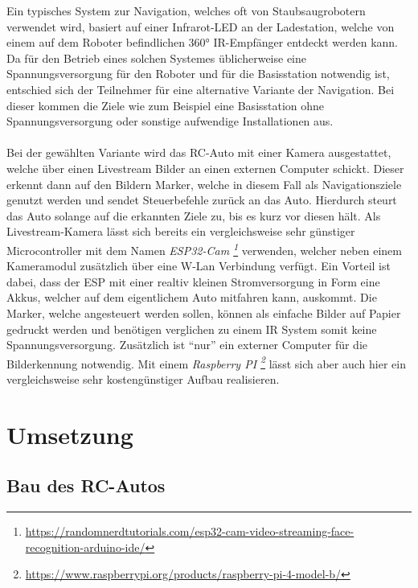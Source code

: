 \documentclass{article}
\begin{document}
Ein typisches System zur Navigation, welches oft von Staubsaugrobotern verwendet wird, basiert auf einer Infrarot-LED
an der Ladestation, welche von einem auf dem Roboter befindlichen 360° IR-Empfänger entdeckt werden kann.
Da für den Betrieb eines solchen Systemes üblicherweise eine Spannungsversorgung für den Roboter und für die Basisstation
notwendig ist, entschied sich der Teilnehmer für eine alternative Variante der Navigation. Bei dieser kommen die Ziele
wie zum Beispiel eine Basisstation ohne Spannungsversorgung oder sonstige aufwendige Installationen aus.
\\~\\
Bei der gewählten Variante wird das RC-Auto mit einer Kamera ausgestattet, welche über einen Livestream Bilder
an einen externen Computer schickt. Dieser erkennt dann auf den Bildern Marker, welche in diesem Fall als Navigationsziele
genutzt werden und sendet Steuerbefehle zurück an das Auto. Hierdurch steurt das Auto solange auf die erkannten Ziele zu,
bis es kurz vor diesen hält. Als Livestream-Kamera lässt sich bereits ein vergleichsweise sehr günstiger Microcontroller mit dem Namen
\textit{ESP32-Cam \footnote{\url{https://randomnerdtutorials.com/esp32-cam-video-streaming-face-recognition-arduino-ide/}}} verwenden,
welcher neben einem Kameramodul zusätzlich über eine W-Lan Verbindung verfügt. Ein Vorteil ist dabei, dass der ESP mit einer
realtiv kleinen Stromversorgung in Form eine Akkus, welcher auf dem eigentlichem Auto mitfahren kann, auskommt.
Die Marker, welche angesteuert werden sollen, können als einfache Bilder auf Papier gedruckt werden und benötigen verglichen
zu einem IR System  somit keine Spannungsversorgung. Zusätzlich ist \enquote{nur} ein externer Computer für die Bilderkennung notwendig.
Mit einem \textit{Raspberry PI \footnote{\url{https://www.raspberrypi.org/products/raspberry-pi-4-model-b/}}} lässt sich aber auch hier
ein vergleichsweise sehr kostengünstiger Aufbau realisieren.

\section{Umsetzung}

\subsection{Bau des RC-Autos}
\end{document}
